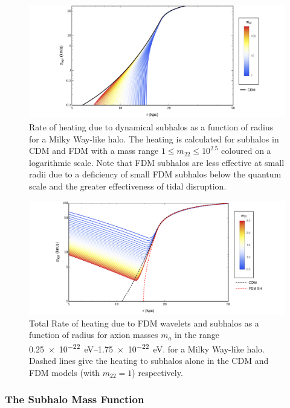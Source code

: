 \documentclass[usenatbib]{mnras}
\begin{document}
\begin{figure}
\includegraphics[width= 17cm]{CDM_velocity}
\caption{Rate of heating due to dynamical subhalos as a function of radius for a Milky Way-like halo. The heating is calculated for subhalos in CDM and FDM with a mass range $1 \le m_{22} \le 10^{2.5}$ coloured on a logarithmic scale. Note that FDM subhalos are less effective at small radii due to a deficiency of small FDM subhalos below the quantum scale and the greater effectiveness of tidal disruption.}
\label{fig:CDMheating}
\end{figure}

\begin{figure}
\includegraphics[width=17cm]{FDM_velocity}
\caption{Total Rate of heating due to FDM wavelets and subhalos as a function of radius for axion masses $m_{a}$ in the range \SIrange{0.25 e-22}{ 1.75 e-22}{\electronvolt}. for a Milky Way-like halo. Dashed lines give the heating to subhalos alone in the CDM and FDM models (with $m_{22} = 1$) respectively.}
\label{fig:radiusheating}
\end{figure}



\subsubsection{The Subhalo Mass Function}
\end{document}
